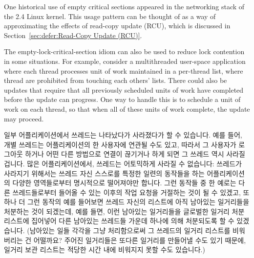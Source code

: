 {	One historical use of empty critical sections appeared in the
	networking stack of the 2.4 Linux kernel.
	This usage pattern can be thought of as a way of approximating
	the effects of read-copy update (RCU), which is discussed in
	Section~\ref{sec:defer:Read-Copy Update (RCU)}.

	The empty-lock-critical-section idiom can also be used to
	reduce lock contention in some situations.
	For example, consider a multithreaded user-space application where
	each thread processes unit of work maintained in a per-thread
	list, where thread are prohibited from touching each others'
	lists.
	There could also be updates that require that all previously
	scheduled units of work have completed before the update can
	progress.
	One way to handle this is to schedule a unit of work on each
	thread, so that when all of these units of work complete, the
	update may proceed.
	\fi

	일부 어플리케이션에서 쓰레드는 나타났다가 사라졌다가 할 수 있습니다.
	예를 들어, 개별 쓰레드는 어플리케이션의 한 사용자에 연관될 수도 있고,
	따라서 그 사용자가 로그아웃 하거나 어떤 다른 방법으로 연결이 끊기거나
	하게 되면 그 쓰레드 역시 사라질 겁니다.
	많은 어플리케이션에서, 쓰레드는 어토믹하게 사라질 수 없습니다: 쓰레드가
	사라지기 위해서는 쓰레드 자신 스스로를 특정한 일련의 동작들을 하는
	어플리케이션의 다양한 영역들로부터 명시적으로 떨어져야만 합니다.
	그런 동작들 중 한 예로는 다른 쓰레드들로부터 들어올 수 있는 이후의 작업
	요청을 거절하는 것이 될 수 있겠고, 또하나 더 그런 동작의 예를 들어보면
	쓰레드 자신의 리스트에 아직 남아있는 일거리들을 처분하는 것이 되겠는데,
	예를 들면, 이런 남아있는 일거리들을 글로벌한 일거리 처분 리스트에
	집어넣어 다른 남아있는 쓰레드들 가운데 하나에 의해 처분되도록 할 수
	있겠습니다.
	(남아있는 일들 각각을 그냥 처리함으로써 그 쓰레드의 일거리 리스트를
	비워버리는 건 어떨까요?
	주어진 일거리들은 또다른 일거리를 만들어낼 수도 있기 때문에, 일거리
	보관 리스트는 적당한 시간 내에 비워지지 못할 수도 있습니다.)

}
